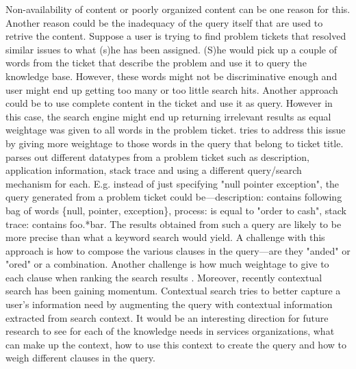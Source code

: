 Non-availability of content or poorly organized content can be one reason for this. Another reason could be the inadequacy of the query itself that are used to retrive the content. Suppose a user is trying to find problem tickets that resolved similar issues to what (s)he has been assigned. (S)he would pick up a couple of words from the ticket that describe the problem and use it to query the knowledge base. However, these words might not be discriminative enough and user might end up getting too many or too little search hits. Another approach could be to use complete content in the ticket and use it as query. However in this case, the search engine might end up returning irrelevant results as equal weightage was given to all words in the problem ticket. \cite{Sinha:2012} tries to address this issue by giving more weightage to those words in the query that belong to ticket title. \cite{Ashok:2009} parses out different datatypes from a problem ticket such as description, application information, stack trace and using a different query/search mechanism for each. E.g. instead of just specifying "null pointer exception", the query generated from a problem ticket could be---description: contains following bag of words \{null, pointer, exception\}, process: is equal to "order to cash", stack trace: contains foo.*bar. The results obtained from such a query are likely to be more precise than what a keyword search would yield. A challenge with this approach is how to compose the various clauses in the query---are they "anded" or "ored" or a combination. Another challenge is how much weightage to give to each clause when ranking the search results \cite{Debdoot:2011:bpm}. Moreover, recently contextual search \cite{wen2004probabilistic,kraft2005q} has been gaining momentum. Contextual search tries to better capture a user's information need by augmenting the query with contextual information extracted from search context. It would be an interesting direction for future research to see for each of the knowledge needs in services organizations, what can make up the context, how to use this context to create the query and how to weigh different clauses in the query. 

